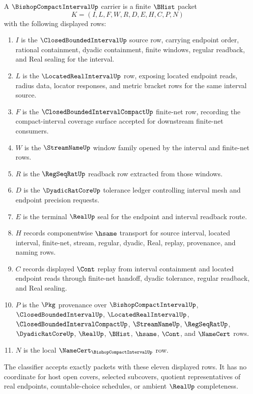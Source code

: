 \begin{definition}
\label{def:bishop-compact-interval-carrier}
A $\BishopCompactIntervalUp$ carrier is a finite $\BHist$ packet
$$
K=(I,L,F,W,R,D,E,H,C,P,N)
$$
with the following displayed rows:
\begin{enumerate}
\item $I$ is the $\ClosedBoundedIntervalUp$ source row, carrying endpoint order, rational containment, dyadic containment, finite windows, regular readback, and Real sealing for the interval.
\item $L$ is the $\LocatedRealIntervalUp$ row, exposing located endpoint reads, radius data, locator responses, and metric bracket rows for the same interval source.
\item $F$ is the $\ClosedBoundedIntervalCompactUp$ finite-net row, recording the compact-interval coverage surface accepted for downstream finite-net consumers.
\item $W$ is the $\StreamNameUp$ window family opened by the interval and finite-net rows.
\item $R$ is the $\RegSeqRatUp$ readback row extracted from those windows.
\item $D$ is the $\DyadicRatCoreUp$ tolerance ledger controlling interval mesh and endpoint precision requests.
\item $E$ is the terminal $\RealUp$ seal for the endpoint and interval readback route.
\item $H$ records componentwise $\hsame$ transport for source interval, located interval, finite-net, stream, regular, dyadic, Real, replay, provenance, and naming rows.
\item $C$ records displayed $\Cont$ replay from interval containment and located endpoint reads through finite-net handoff, dyadic tolerance, regular readback, and Real sealing.
\item $P$ is the $\Pkg$ provenance over $\BishopCompactIntervalUp$, $\ClosedBoundedIntervalUp$, $\LocatedRealIntervalUp$, $\ClosedBoundedIntervalCompactUp$, $\StreamNameUp$, $\RegSeqRatUp$, $\DyadicRatCoreUp$, $\RealUp$, $\BHist$, $\hsame$, $\Cont$, and $\NameCert$ rows.
\item $N$ is the local $\NameCert_{\BishopCompactIntervalUp}$ row.
\end{enumerate}
The classifier accepts exactly packets with these eleven displayed rows. It has no coordinate for host open covers, selected subcovers, quotient representatives of real endpoints, countable-choice schedules, or ambient $\RealUp$ completeness.
\end{definition}


